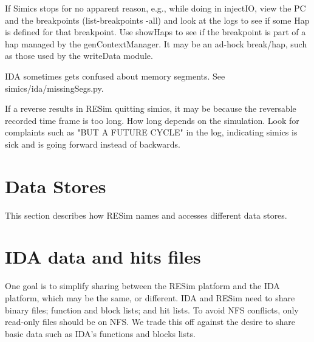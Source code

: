 \documentclass[titlepage]{article}
\begin{document}
If Simics stops for no apparent reason, e.g., while doing in injectIO, view the PC and the breakpoints (list-breakpoints -all)
and look at the logs to see if some Hap is defined for that breakpoint.  Use showHaps to see if the breakpoint is part of a hap
managed by the genContextManager.  It may be an ad-hock break/hap, such as those used by the writeData module.

IDA sometimes gets confused about memory segments.  See simics/ida/missingSegs.py.

If a reverse results in RESim quitting simics, it may be because the reversable recorded time frame is too long.  How long depends
on the simulation.  Look for complaints such as "BUT A FUTURE CYCLE" in the log, indicating simics is sick and is going forward
instead of backwards.

\section{Data Stores}
\label{data-stores}
This section describes how RESim names and accesses different data stores.

\section{IDA data and hits files}
One goal is to simplify sharing between the RESim platform and the IDA platform,
which may be the same, or different.  IDA and RESim need to share binary files; function and block lists; and hit lists.
To avoid NFS conflicts, only read-only files should be on NFS. We trade this off against
the desire to share basic data such as IDA's functions and blocks lists.  
\end{document}
